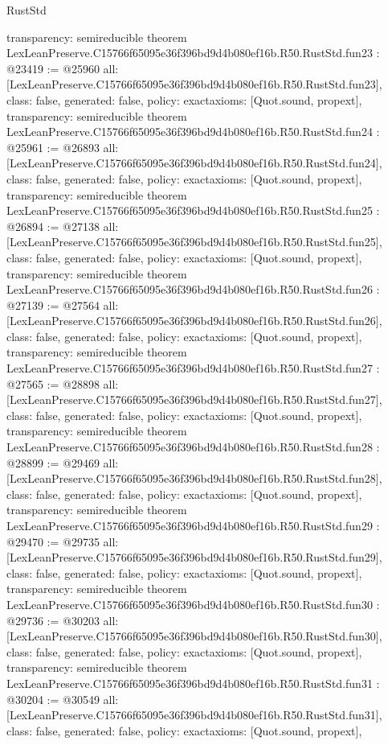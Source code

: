 \begin{lexlean}{RustStd}
\begin{coremodule}
{  transparency: semireducible
}
theorem LexLeanPreserve.C15766f65095e36f396bd9d4b080ef16b.R50.RustStd.fun23 : @23419 := @25960 {
  all: [LexLeanPreserve.C15766f65095e36f396bd9d4b080ef16b.R50.RustStd.fun23],
  class: false,
  generated: false,
  policy: exact{axioms: [Quot.sound, propext]},
  transparency: semireducible
}
theorem LexLeanPreserve.C15766f65095e36f396bd9d4b080ef16b.R50.RustStd.fun24 : @25961 := @26893 {
  all: [LexLeanPreserve.C15766f65095e36f396bd9d4b080ef16b.R50.RustStd.fun24],
  class: false,
  generated: false,
  policy: exact{axioms: [Quot.sound, propext]},
  transparency: semireducible
}
theorem LexLeanPreserve.C15766f65095e36f396bd9d4b080ef16b.R50.RustStd.fun25 : @26894 := @27138 {
  all: [LexLeanPreserve.C15766f65095e36f396bd9d4b080ef16b.R50.RustStd.fun25],
  class: false,
  generated: false,
  policy: exact{axioms: [Quot.sound, propext]},
  transparency: semireducible
}
theorem LexLeanPreserve.C15766f65095e36f396bd9d4b080ef16b.R50.RustStd.fun26 : @27139 := @27564 {
  all: [LexLeanPreserve.C15766f65095e36f396bd9d4b080ef16b.R50.RustStd.fun26],
  class: false,
  generated: false,
  policy: exact{axioms: [Quot.sound, propext]},
  transparency: semireducible
}
theorem LexLeanPreserve.C15766f65095e36f396bd9d4b080ef16b.R50.RustStd.fun27 : @27565 := @28898 {
  all: [LexLeanPreserve.C15766f65095e36f396bd9d4b080ef16b.R50.RustStd.fun27],
  class: false,
  generated: false,
  policy: exact{axioms: [Quot.sound, propext]},
  transparency: semireducible
}
theorem LexLeanPreserve.C15766f65095e36f396bd9d4b080ef16b.R50.RustStd.fun28 : @28899 := @29469 {
  all: [LexLeanPreserve.C15766f65095e36f396bd9d4b080ef16b.R50.RustStd.fun28],
  class: false,
  generated: false,
  policy: exact{axioms: [Quot.sound, propext]},
  transparency: semireducible
}
theorem LexLeanPreserve.C15766f65095e36f396bd9d4b080ef16b.R50.RustStd.fun29 : @29470 := @29735 {
  all: [LexLeanPreserve.C15766f65095e36f396bd9d4b080ef16b.R50.RustStd.fun29],
  class: false,
  generated: false,
  policy: exact{axioms: [Quot.sound, propext]},
  transparency: semireducible
}
theorem LexLeanPreserve.C15766f65095e36f396bd9d4b080ef16b.R50.RustStd.fun30 : @29736 := @30203 {
  all: [LexLeanPreserve.C15766f65095e36f396bd9d4b080ef16b.R50.RustStd.fun30],
  class: false,
  generated: false,
  policy: exact{axioms: [Quot.sound, propext]},
  transparency: semireducible
}
theorem LexLeanPreserve.C15766f65095e36f396bd9d4b080ef16b.R50.RustStd.fun31 : @30204 := @30549 {
  all: [LexLeanPreserve.C15766f65095e36f396bd9d4b080ef16b.R50.RustStd.fun31],
  class: false,
  generated: false,
  policy: exact{axioms: [Quot.sound, propext]},
}
\end{coremodule}
\end{lexlean}

